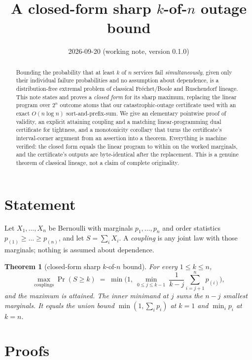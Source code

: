 \documentclass[11pt]{article}
\title{A closed-form sharp $k$-of-$n$ outage bound}
\author{}
\date{2026-09-20 (working note, version 0.1.0)}
\newtheorem{theorem}{Theorem}
\begin{document}
\maketitle

\begin{abstract}
Bounding the probability that at least $k$ of $n$ services fail
\emph{simultaneously}, given only their individual failure probabilities and no
assumption about dependence, is a distribution-free extremal problem of classical
Fr\'echet/Boole and Ruschendorf lineage. This note states and proves a
\emph{closed form} for its sharp maximum, replacing the linear program over $2^n$
outcome atoms that our catastrophic-outage certificate used with an exact
$O(n\log n)$ sort-and-prefix-sum. We give an elementary pointwise proof of validity,
an explicit attaining coupling and a matching linear-programming dual certificate
for tightness, and a monotonicity corollary that turns the certificate's
interval-corner argument from an assertion into a theorem. Everything is machine
verified: the closed form equals the linear program to within
\KofnMaxLpError{} on the worked marginals, and the certificate's outputs are
byte-identical after the replacement. This is a genuine theorem of classical
lineage, not a claim of complete originality.
\end{abstract}

\section{Statement}
Let $X_1,\dots,X_n$ be Bernoulli with marginals $p_1,\dots,p_n$ and order
statistics $p_{(1)}\ge\dots\ge p_{(n)}$, and let $S=\sum_i X_i$. A
\emph{coupling} is any joint law with those marginals; nothing is assumed about
dependence.

\begin{theorem}[closed-form sharp $k$-of-$n$ bound]
For every $1\le k\le n$,
\[
\max_{\text{couplings}}\Pr(S\ge k)
 \;=\; \min\!\Big(1,\ \min_{0\le j\le k-1}\ \frac{1}{k-j}\sum_{i=j+1}^{n} p_{(i)}\Big),
\]
and the maximum is attained. The inner minimand at $j$ sums the $n-j$
\emph{smallest} marginals. It equals the union bound $\min(1,\sum_i p_i)$ at $k=1$
and $\min_i p_i$ at $k=n$.
\end{theorem}

\section{Proofs}
\end{document}
